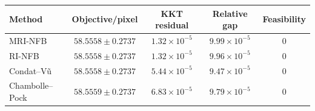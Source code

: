 \begin{tabular}{lcccc}\hline
Method & Objective/pixel & KKT residual & Relative gap & Feasibility \\
\hline
MRI-NFB & $58.5558 \pm 0.2737$ & $1.32\times10^{-5}$ & $9.99\times10^{-5}$ & $0$ \\
RI-NFB & $58.5558 \pm 0.2737$ & $1.32\times10^{-5}$ & $9.96\times10^{-5}$ & $0$ \\
Condat--V{\~u} & $58.5558 \pm 0.2737$ & $5.44\times10^{-5}$ & $9.47\times10^{-5}$ & $0$ \\
Chambolle--Pock & $58.5559 \pm 0.2737$ & $6.83\times10^{-5}$ & $9.79\times10^{-5}$ & $0$ \\
\hline\end{tabular}
